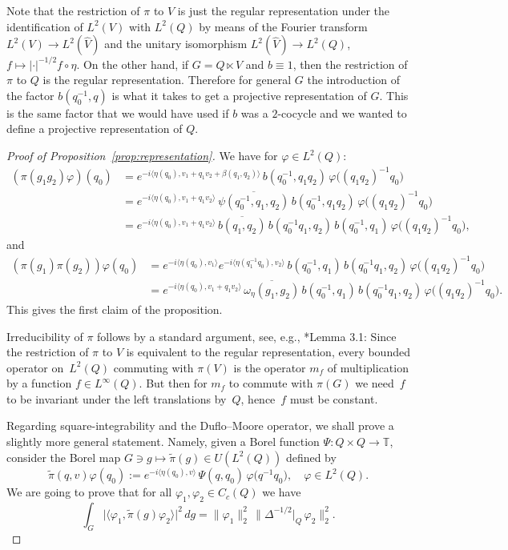 \documentclass[a4paper,11pt,reqno]{amsart}
\numberwithin{equation}{section}
\theoremstyle{remark}
\theoremstyle{definition}
\newcommand\T{{\mathbb T}}
\newcommand{\vf}{\varphi}
\begin{document}
Note that the restriction of $\pi$ to $V$ is just the regular representation under the identification of $L^2(V)$ with $L^2(Q)$ by means of the Fourier transform $L^2(V)\to L^2(\hat V)$ and the unitary isomorphism $L^2(\hat V)\to L^2(Q)$, $f\mapsto |\cdot|^{-1/2}f\circ\eta$. On the other hand, if $G=Q\ltimes V$ and $b\equiv1$, then the restriction of $\pi$ to $Q$ is the regular representation. Therefore for general $G$ the introduction of the factor $b (q_0^{-1},q)$ is what it takes to get a projective representation of $G$. This is the same factor that we would have used if $b$ was a $2$-cocycle and we wanted to define a projective representation of $Q$.

\begin{proof}[Proof of Proposition~\ref{prop:representation}]
We have for $\vf\in L^2(Q)$:
\begin{align*}
(\pi(g_1g_2)\vf)(q_0)&=e^{-i \langle\eta(q_0),v_1+q_1v_2+\beta(q_1,q_2)\rangle}\,b (q_0^{-1},q_1q_2)
\, \vf\big((q_1q_2)^{-1}q_0\big)\\
&=e^{-i \langle\eta(q_0),v_1+q_1v_2\rangle}\,\overline{\psi(q_0^{-1},q_1,q_2)}\,b (q_0^{-1},q_1q_2)
\, \vf\big((q_1q_2)^{-1}q_0\big)\\
&=e^{-i \langle\eta(q_0),v_1+q_1v_2\rangle}\,\overline{b (q_1,q_2)}\,
b (q_0^{-1}q_1,q_2)\,b (q_0^{-1},q_1)\, \vf\big((q_1q_2)^{-1}q_0\big),
\end{align*}
and
\begin{align*}
(\pi(g_1)\pi(g_2))\vf(q_0)&=e^{-i \langle\eta(q_0),v_1\rangle}e^{-i \langle\eta(q_1^{-1}q_0),v_2\rangle}\,b (q_0^{-1},q_1)
\,b (q_0^{-1}q_1,q_2)\,\vf\big((q_1q_2)^{-1}q_0\big)\\
&=e^{-i \langle\eta(q_0),v_1+q_1v_2\rangle}\,\overline{\omega_\eta(g_1,g_2)}\,b (q_0^{-1},q_1)
\,b (q_0^{-1}q_1,q_2)
\, \vf\big((q_1q_2)^{-1}q_0\big).
\end{align*}
This gives the first claim of the proposition.

\smallskip

Irreducibility of $\pi$ follows by a standard argument, see, e.g., \cite{GM}*{Lemma 3.1}: Since the restriction of $\pi$ to $V$ is equivalent to the regular representation, every bounded operator on~$L^2(Q)$ commuting with $\pi(V)$ is the operator $m_f$ of multiplication by a function $f\in L^\infty(Q)$. But then for $m_f$ to commute with $\pi(G)$ we need~$f$ to be invariant under the left translations by~$Q$, hence~$f$ must be constant.

\smallskip

Regarding square-integrability and the Duflo--Moore operator, we shall prove a slightly more general statement. Namely, given a Borel function  $\Psi:Q\times Q\to \T$,
consider the Borel map $G\ni g\mapsto \tilde\pi(g)\in U(L^2(Q))$ defined by
$$
\tilde\pi(q,v)\vf(q_0):=e^{-i \langle\eta(q_0),v\rangle}\,\Psi(q,q_0)\,\vf\big(q^{-1}q_0\big),\quad  \vf\in L^2(Q).
$$
We are going to prove that for all $\vf_1,\vf_2\in C_c(Q)$ we have
$$
\int_G \big|\langle\vf_1,\tilde\pi(g)\vf_2\rangle\big|^2\,dg=\|\vf_1\|_2^2\,\|\Delta^{-1/2}|_Q\,\vf_2\|_2^2.
$$


\end{proof}
\end{document}
